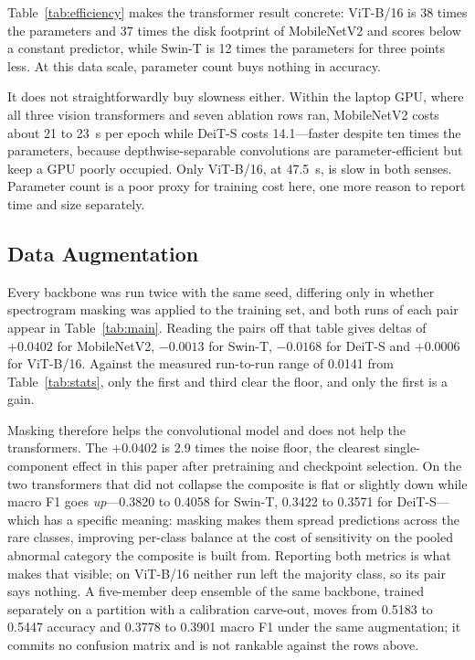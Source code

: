 \documentclass[journal,onecolumn]{IEEEtran}
\begin{document}
Table~\ref{tab:efficiency} makes the transformer result concrete: ViT-B/16 is 38 times the
parameters and 37 times the disk footprint of MobileNetV2 and scores below a constant
predictor, while Swin-T is 12 times the parameters for three points less. At this data
scale, parameter count buys nothing in accuracy.

It does not straightforwardly buy slowness either. Within the laptop GPU, where all three
vision transformers and seven ablation rows ran, MobileNetV2 costs about 21 to 23~s per epoch
while DeiT-S costs 14.1---faster despite ten times the parameters, because depthwise-separable
convolutions are parameter-efficient but keep a GPU poorly occupied. Only ViT-B/16, at 47.5~s,
is slow in both senses. Parameter count is a poor proxy for training cost here, one more reason
to report time and size separately.

\subsection{Data Augmentation}
\label{subsec:augmentation}

Every backbone was run twice with the same seed, differing only in whether spectrogram masking
was applied to the training set, and both runs of each pair appear in Table~\ref{tab:main}.
Reading the pairs off that table gives deltas of $+0.0402$ for MobileNetV2, $-0.0013$ for
Swin-T, $-0.0168$ for DeiT-S and $+0.0006$ for ViT-B/16. Against the measured run-to-run range
of 0.0141 from Table~\ref{tab:stats}, only the first and third clear the floor, and only the
first is a gain.

Masking therefore helps the convolutional model and does not help the transformers. The
$+0.0402$ is 2.9 times the noise floor, the clearest single-component effect in this paper after
pretraining and checkpoint selection. On the two transformers that did not collapse the
composite is flat or slightly down while macro F1 goes \emph{up}---0.3820 to 0.4058 for Swin-T,
0.3422 to 0.3571 for DeiT-S---which has a specific meaning: masking makes them spread
predictions across the rare classes, improving per-class balance at the cost of sensitivity on
the pooled abnormal category the composite is built from. Reporting both metrics is what makes
that visible; on ViT-B/16 neither run left the majority class, so its pair says nothing. A
five-member deep ensemble of the same backbone, trained separately on a partition with a
calibration carve-out, moves from 0.5183 to 0.5447 accuracy and 0.3778 to 0.3901 macro F1 under
the same augmentation; it commits no confusion matrix and is not rankable against the rows
above.
\end{document}
